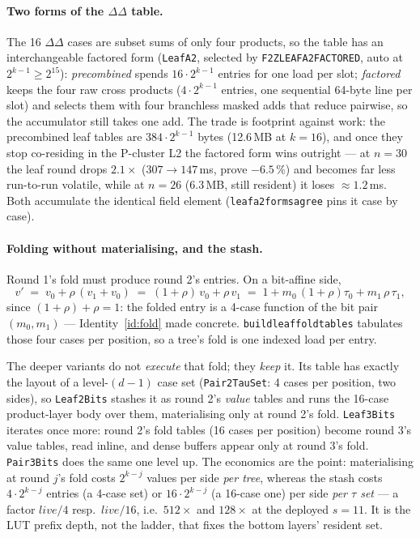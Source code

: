 \documentclass[11pt]{article}
\newcommand{\code}[1]{{\def\_{\textunderscore\allowbreak}\texttt{#1}}}
\theoremstyle{definition}
\begin{document}
\paragraph{Two forms of the $\Delta\Delta$ table.}
The 16 $\Delta\Delta$ cases are subset sums of only four products, so
the table has an interchangeable factored form (\code{LeafA2}, selected
by \code{F2Z\_LEAF\_A2\_FACTORED}, auto at $2^{k-1} \ge 2^{15}$):
\emph{precombined} spends $16\cdot2^{k-1}$ entries for one load per
slot; \emph{factored} keeps the four raw cross products
($4\cdot2^{k-1}$ entries, one sequential 64-byte line per slot) and
selects them with four branchless masked adds that reduce pairwise, so
the accumulator still takes one add.  The trade is footprint against
work: the precombined leaf tables are $384\cdot2^{k-1}$ bytes
(12.6\,MB at $k = 16$), and once they stop co-residing in the
P-cluster L2 the factored form wins outright --- at $n = 30$ the leaf
round drops $2.1\times$ ($307 \to 147$\,ms, prove $-6.5\,\%$) and
becomes far less run-to-run volatile, while at $n = 26$ (6.3\,MB, still
resident) it loses ${\approx}1.2$\,ms.  Both accumulate the identical
field element (\code{leaf\_a2\_forms\_agree} pins it case by case).

\paragraph{Folding without materialising, and the stash.}
Round 1's fold must produce round 2's entries.  On a bit-affine side,
\[
  v' \;=\; v_0 + \rho\,(v_1 + v_0) \;=\; (1+\rho)\,v_0 + \rho\,v_1
      \;=\; 1 + m_0\,(1+\rho)\tau_0 + m_1\,\rho\,\tau_1 ,
\]
since $(1+\rho) + \rho = 1$: the folded entry is a 4-case function of
the bit pair $(m_0, m_1)$ --- Identity~\ref{id:fold} made concrete.
\code{build\_leaf\_fold\_tables} tabulates those four cases per
position, so a tree's fold is one indexed load per entry.

The deeper variants do not \emph{execute} that fold; they \emph{keep}
it.  Its table has exactly the layout of a level-$(d{-}1)$ case set
(\code{Pair2TauSet}: 4 cases per position, two sides), so
\code{Leaf2Bits} stashes it as round 2's \emph{value} tables and runs
the 16-case product-layer body over them, materialising only at round
2's fold.  \code{Leaf3Bits} iterates once more: round 2's fold tables
(16 cases per position) become round 3's value tables, read inline, and
dense buffers appear only at round 3's fold.  \code{Pair3Bits} does the
same one level up.  The economics are the point: materialising at round
$j$'s fold costs $2^{k-j}$ values per side \emph{per tree}, whereas the
stash costs $4\cdot2^{k-j}$ entries (a 4-case set) or $16\cdot2^{k-j}$
(a 16-case one) per side \emph{per $\tau$ set} --- a factor
$\mathit{live}/4$ resp.\ $\mathit{live}/16$, i.e.\ $512\times$ and
$128\times$ at the deployed $s = 11$.  It is the LUT prefix depth, not
the ladder, that fixes the bottom layers' resident set.
\end{document}
